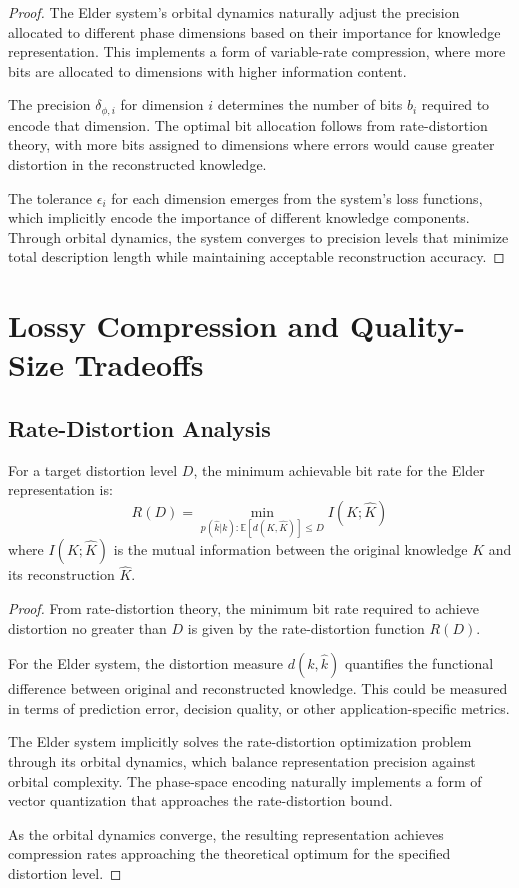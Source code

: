 \begin{proof}
The Elder system's orbital dynamics naturally adjust the precision allocated to different phase dimensions based on their importance for knowledge representation. This implements a form of variable-rate compression, where more bits are allocated to dimensions with higher information content.

The precision $\delta_{\phi,i}$ for dimension $i$ determines the number of bits $b_i$ required to encode that dimension. The optimal bit allocation follows from rate-distortion theory, with more bits assigned to dimensions where errors would cause greater distortion in the reconstructed knowledge.

The tolerance $\epsilon_i$ for each dimension emerges from the system's loss functions, which implicitly encode the importance of different knowledge components. Through orbital dynamics, the system converges to precision levels that minimize total description length while maintaining acceptable reconstruction accuracy.
\end{proof}

\section{Lossy Compression and Quality-Size Tradeoffs}

\subsection{Rate-Distortion Analysis}

\begin{theorem}
For a target distortion level $D$, the minimum achievable bit rate for the Elder representation is:
\begin{equation}
R(D) = \min_{p(\hat{k}|k) : \mathbb{E}[d(K,\hat{K})] \leq D} I(K; \hat{K})
\end{equation}
where $I(K; \hat{K})$ is the mutual information between the original knowledge $K$ and its reconstruction $\hat{K}$.
\end{theorem}

\begin{proof}
From rate-distortion theory, the minimum bit rate required to achieve distortion no greater than $D$ is given by the rate-distortion function $R(D)$.

For the Elder system, the distortion measure $d(k, \hat{k})$ quantifies the functional difference between original and reconstructed knowledge. This could be measured in terms of prediction error, decision quality, or other application-specific metrics.

The Elder system implicitly solves the rate-distortion optimization problem through its orbital dynamics, which balance representation precision against orbital complexity. The phase-space encoding naturally implements a form of vector quantization that approaches the rate-distortion bound.

As the orbital dynamics converge, the resulting representation achieves compression rates approaching the theoretical optimum for the specified distortion level.
\end{proof}

